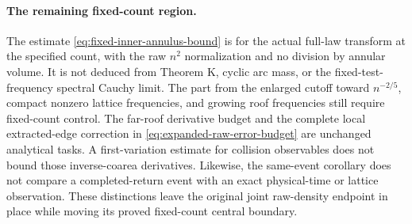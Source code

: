 \paragraph{The remaining fixed-count region.}
The estimate \eqref{eq:fixed-inner-annulus-bound} is for the actual
full-law transform at the specified count, with the raw $n^2$
normalization and no division by annular volume. It is not deduced
from Theorem K, cyclic arc mass, or the fixed-test-frequency spectral
Cauchy limit. The part from the enlarged cutoff toward $n^{-2/5}$,
compact nonzero lattice frequencies, and growing roof frequencies
still require fixed-count control. The far-roof derivative budget and
the complete local extracted-edge correction in
\eqref{eq:expanded-raw-error-budget} are unchanged analytical tasks.
A first-variation estimate for collision observables does not bound
those inverse-coarea derivatives. Likewise, the same-event corollary
does not compare a completed-return event with an exact physical-time
or lattice observation. These distinctions leave the original joint
raw-density endpoint in place while moving its proved fixed-count
central boundary.
